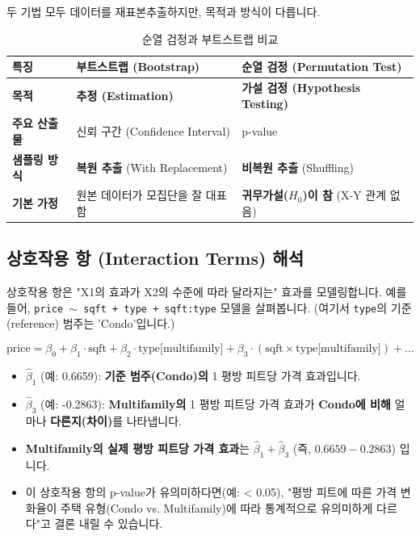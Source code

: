 \documentclass[11pt,a4paper]{book}
\theoremstyle{definition}
\begin{document}
두 기법 모두 데이터를 재표본추출하지만, 목적과 방식이 다릅니다.

\begin{table}[h!]
  \centering
  \caption{순열 검정과 부트스트랩 비교}
  \label{tab:perm_vs_boot}
  \begin{tabular}{@{}lll@{}}
    \toprule
    \textbf{특징} & \textbf{부트스트랩 (Bootstrap)} & \textbf{순열 검정 (Permutation Test)} \\
    \midrule
    \textbf{목적} & \textbf{추정 (Estimation)} & \textbf{가설 검정 (Hypothesis Testing)} \\
    \textbf{주요 산출물} & 신뢰 구간 (Confidence Interval) & p-value \\
    \textbf{샘플링 방식} & \textbf{복원 추출} (With Replacement) & \textbf{비복원 추출} (Shuffling) \\
    \textbf{기본 가정} & 원본 데이터가 모집단을 잘 대표함 & \textbf{귀무가설($H_0$)이 참} (X-Y 관계 없음) \\
    \bottomrule
  \end{tabular}
\end{table}

\subsection{상호작용 항 (Interaction Terms) 해석}

상호작용 항은 "X1의 효과가 X2의 수준에 따라 달라지는" 효과를 모델링합니다.
예를 들어, \texttt{price $\sim$ sqft + type + sqft:type} 모델을 살펴봅니다. (여기서 \texttt{type}의 기준(reference) 범주는 'Condo'입니다.)

$$ \text{price} = \beta_0 + \beta_1 \cdot \text{sqft} + \beta_2 \cdot \text{type[multifamily]} + \beta_3 \cdot (\text{sqft} \times \text{type[multifamily]}) + \dots $$

\begin{itemize}
    \item $\hat{\beta}_1$ (예: 0.6659): \textbf{기준 범주(Condo)의} 1 평방 피트당 가격 효과입니다.
    \item $\hat{\beta}_3$ (예: -0.2863): \textbf{Multifamily의} 1 평방 피트당 가격 효과가 \textbf{Condo에 비해} 얼마나 \textbf{다른지(차이)}를 나타냅니다.
    \item \textbf{Multifamily의 실제 평방 피트당 가격 효과}는 $\hat{\beta}_1 + \hat{\beta}_3$ (즉, $0.6659 - 0.2863$) 입니다.
    \item 이 상호작용 항의 p-value가 유의미하다면(예: < 0.05), "평방 피트에 따른 가격 변화율이 주택 유형(Condo vs. Multifamily)에 따라 통계적으로 유의미하게 다르다"고 결론 내릴 수 있습니다.
\end{itemize}
\end{document}
